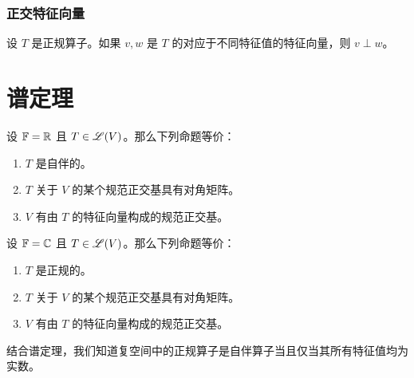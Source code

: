 \subsubsection{正交特征向量}
\begin{theorem}
    设 \(T\) 是正规算子。如果 \(v, w\) 是 \(T\) 的对应于不同特征值的特征向量，则 \(v \perp w\)。
\end{theorem}

\section{谱定理}

\begin{theorem}[实谱定理]
    设 \(\mathbb{F} = \mathbb{R}\) 且 \(T \in \mathscr{L}(V)\)。那么下列命题等价：
    \begin{enumerate}
        \item \(T\) 是自伴的。
        \item \(T\) 关于 \(V\) 的某个规范正交基具有对角矩阵。
        \item \(V\) 有由 \(T\) 的特征向量构成的规范正交基。
    \end{enumerate}
\end{theorem}

\begin{theorem}[复谱定理]
    设 \(\mathbb{F} = \mathbb{C}\) 且 \(T \in \mathscr{L}(V)\)。那么下列命题等价：
    \begin{enumerate}
        \item \(T\) 是正规的。
        \item \(T\) 关于 \(V\) 的某个规范正交基具有对角矩阵。
        \item \(V\) 有由 \(T\) 的特征向量构成的规范正交基。
    \end{enumerate}
\end{theorem}

结合谱定理，我们知道复空间中的正规算子是自伴算子当且仅当其所有特征值均为实数。

